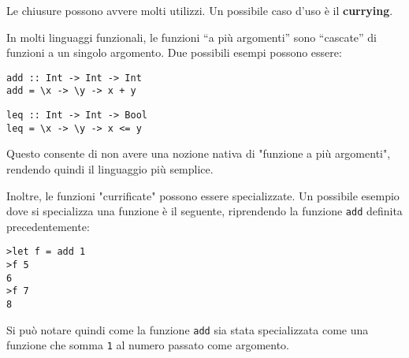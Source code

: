 \documentclass{article}
\begin{document}
Le chiusure possono avvere molti utilizzi. Un possibile caso d'uso è il \textbf{currying}.

In molti linguaggi funzionali, le funzioni “a più argomenti” sono “cascate” di funzioni a un singolo argomento. Due possibili esempi possono essere:
\begin{tcolorbox}
\begin{verbatim}
add :: Int -> Int -> Int
add = \x -> \y -> x + y
\end{verbatim}
\end{tcolorbox}
\begin{tcolorbox}
\begin{verbatim}
leq :: Int -> Int -> Bool
leq = \x -> \y -> x <= y
\end{verbatim}
\end{tcolorbox}

Questo consente di non avere una nozione nativa di "funzione a più argomenti", rendendo quindi il linguaggio più semplice.

Inoltre, le funzioni "currificate" possono essere specializzate. Un possibile esempio dove si specializza una funzione è il seguente, riprendendo la funzione \texttt{add} definita precedentemente:
\begin{tcolorbox}
\begin{verbatim}
>let f = add 1
>f 5
6
>f 7
8
\end{verbatim}
\end{tcolorbox}
Si può notare quindi come la funzione \texttt{add} sia stata specializzata come una funzione che somma \texttt{1} al numero passato come argomento. 
\end{document}
